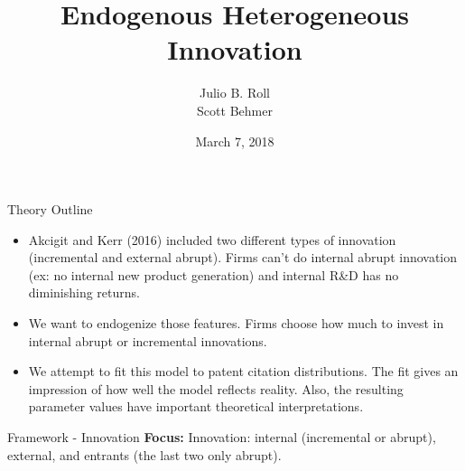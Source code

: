 \documentclass[11pt]{beamer}
\author{Julio B. Roll \\ Scott Behmer}
\title{Endogenous Heterogeneous Innovation}
\date{March 7, 2018}
\begin{document}
\begin{frame}
	\maketitle
\end{frame}

\begin{frame}{Theory Outline}
	\begin{itemize}\itemsep12pt
	\item Akcigit and Kerr (2016) included two different types of innovation (incremental and external abrupt). Firms can't do internal abrupt innovation (ex: no internal new product generation) and internal R\&D has no diminishing returns.
	\item We want to endogenize those features. Firms choose how much to invest in internal abrupt or incremental innovations.
	\item We attempt to fit this model to patent citation distributions. The fit gives an impression of how well the model reflects reality. Also, the resulting parameter values have important theoretical interpretations.
	\end{itemize}
\end{frame}

\begin{frame}{Framework - Innovation}
	\textbf{Focus:} Innovation: internal (incremental or abrupt), external, and entrants (the last two only abrupt).
	\begin{center}
	\begin{figure}\centering\label{Innov5}
	\end{figure}
	\end{center}
\end{frame}
\end{document}
